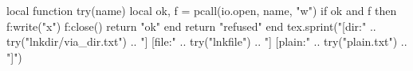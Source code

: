 \documentclass{article}
\begin{document}
\begin{luacode*}
local function try(name)
  local ok, f = pcall(io.open, name, "w")
  if ok and f then f:write("x") f:close() return "ok" end
  return "refused"
end
tex.sprint("[dir:" .. try("lnkdir/via_dir.txt") .. "] [file:" .. try("lnkfile") .. "] [plain:" .. try("plain.txt") .. "]")
\end{luacode*}
\end{document}
